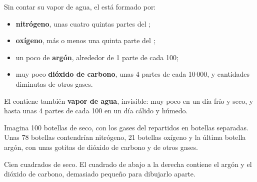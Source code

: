 \begin{proposition}\label{prop:g4:air-a-mixture-of-gases:composition}
Sin contar su vapor de agua, el  está formado por:
\begin{itemize}
  \item \textbf{nitrógeno}, unas cuatro quintas partes del ;
  \item \textbf{oxígeno}, más o menos una quinta parte del ;
  \item un poco de \textbf{argón}, alrededor de 1 parte de cada 100;
  \item muy poco \textbf{dióxido de carbono}, unas 4 partes de cada
        10\,000, y cantidades diminutas de otros gases.
\end{itemize}
El  contiene también \textbf{vapor de agua}, invisible: muy poco en
un día frío y seco, y hasta unas 4 partes de cada 100 en un día cálido y
húmedo.
\end{proposition}

\begin{example}\label{ex:g4:air-a-mixture-of-gases:hundred}
Imagina 100 botellas de  seco, con los gases del  repartidos en
botellas separadas. Unas 78 botellas contendrían nitrógeno, 21 botellas
oxígeno y la última botella argón, con unas gotitas de dióxido de
carbono y de otros gases.
\end{example}

\begin{omfigure}

{\small Cien cuadrados de  seco. El cuadrado de abajo a la derecha
contiene el argón y el dióxido de carbono, demasiado pequeño para
dibujarlo aparte.}
\end{omfigure}

